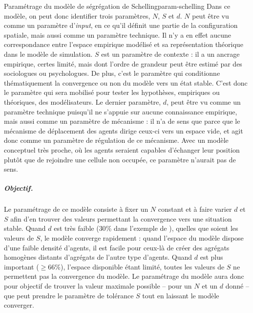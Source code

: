 \begin{encadre}{Paramétrage du modèle de ségrégation de Schelling}{param-schelling}
Dans ce modèle, on peut donc identifier trois paramètres, $N$, $S$ et $d$.
$N$ peut être vu comme un paramètre d'\textit{input}, en ce qu'il définit une partie de la configuration spatiale, mais aussi comme un paramètre technique.
Il n'y a en effet aucune correspondance entre l'espace empirique modélisé et
sa représentation théorique dans le modèle de simulation.
$S$ est un paramètre de contexte : il a un ancrage empirique, certes limité, mais dont l'ordre de grandeur peut être estimé par des sociologues ou psychologues.
De plus, c'est le paramètre qui conditionne thématiquement la convergence ou non du modèle vers un état stable.
C'est donc le paramètre qui sera mobilisé pour tester les hypothèses, empiriques ou théoriques, des modélisateurs.
Le dernier paramètre, $d$, peut être vu comme un paramètre technique puisqu'il ne s'appuie sur aucune connaissance empirique, mais aussi comme un paramètre de mécanisme : il n'a de sens que parce que le mécanisme de déplacement des agents dirige ceux-ci vers un \og espace vide\fg{}, et agit donc comme un paramètre de régulation de ce mécanisme.
Avec un modèle conceptuel très proche, où les agents seraient capables \og d'échanger\fg{} leur position plutôt que de rejoindre une cellule non occupée, ce paramètre n'aurait pas de sens.

\subparagraph{Objectif.}
Le paramétrage de ce modèle consiste à fixer un $N$ constant et à faire varier $d$ et $S$ afin d'en trouver des valeurs permettant la convergence vers une situation stable.
Quand $d$ est très faible ($30$\% dans l'exemple de \textcite{daude_comparaison_2006}), quelles que soient les valeurs de $S$, le modèle converge rapidement :
	quand l'espace du modèle dispose d'une faible densité d'agents, il est facile pour ceux-là de créer des agrégats homogènes distants d'agrégats de l'autre type d'agents.
Quand $d$ est plus important ($\geq66$\%), l'espace disponible étant limité, toutes les valeurs de $S$ ne permettent pas la convergence du modèle.
Le paramétrage du modèle aura donc pour objectif de trouver la valeur maximale possible -- pour un $N$ et un $d$ donné -- que peut prendre le paramètre de tolérance $S$ tout en laissant le modèle converger.


\end{encadre}
